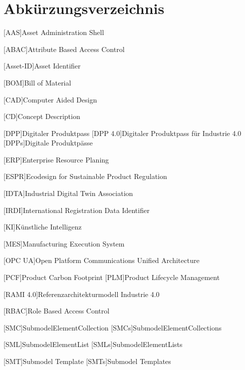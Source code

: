 \section*{Abkürzungsverzeichnis}
\begin{singlespacing}
\end{singlespacing}
\begin{acronym}

[AAS]{Asset Administration Shell}

[ABAC]{Attribute Based Access Control}

[Asset-ID]{Asset Identifier}

[BOM]{Bill of Material}

[CAD]{Computer Aided Design}

[CD]{Concept Description}

[DPP]{Digitaler Produktpass}
[DPP 4.0]{Digitaler Produktpass für Industrie 4.0}
[DPPs]{Digitale Produktpässe}

[ERP]{Enterprise Resource Planing}

[ESPR]{Ecodesign for Sustainable Product Regulation}

[IDTA]{Industrial Digital Twin Association}

[IRDI]{International Registration Data Identifier}

[KI]{Künstliche Intelligenz}

[MES]{Manufacturing Execution System}

[OPC UA]{Open Platform Communications Unified Architecture}

[PCF]{Product Carbon Footprint}
[PLM]{Product Lifecycle Management}

[RAMI 4.0]{Referenzarchitekturmodell Industrie 4.0}

[RBAC]{Role Based Access Control}

[SMC]{SubmodelElementCollection}
[SMCs]{SubmodelElementCollections}

[SML]{SubmodelElementList}
[SMLs]{SubmodelElementLists}

[SMT]{Submodel Template}
[SMTs]{Submodel Templates}

\end{acronym}



\newpage